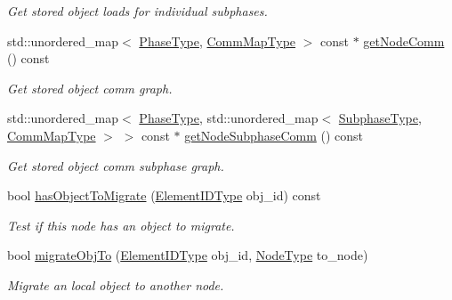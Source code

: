 \begin{DoxyCompactItemize}
\begin{DoxyCompactList}\small\item\em Get stored object loads for individual subphases. \end{DoxyCompactList}\item 
std\+::unordered\+\_\+map$<$ \hyperlink{namespacevt_a46ce6733d5cdbd735d561b7b4029f6d7}{Phase\+Type}, \hyperlink{namespacevt_1_1vrt_1_1collection_1_1balance_a10860c956804d644db54a16012352728}{Comm\+Map\+Type} $>$ const  $\ast$ \hyperlink{structvt_1_1vrt_1_1collection_1_1balance_1_1_node_stats_a236c9f6b9ba7446a35cbc1052949d558}{get\+Node\+Comm} () const
\begin{DoxyCompactList}\small\item\em Get stored object comm graph. \end{DoxyCompactList}\item 
std\+::unordered\+\_\+map$<$ \hyperlink{namespacevt_a46ce6733d5cdbd735d561b7b4029f6d7}{Phase\+Type}, std\+::unordered\+\_\+map$<$ \hyperlink{namespacevt_ae78cbfdf1e57470e33eedb074f2beeba}{Subphase\+Type}, \hyperlink{namespacevt_1_1vrt_1_1collection_1_1balance_a10860c956804d644db54a16012352728}{Comm\+Map\+Type} $>$ $>$ const  $\ast$ \hyperlink{structvt_1_1vrt_1_1collection_1_1balance_1_1_node_stats_ae44b616cad5c50a36faeb2cc78457a52}{get\+Node\+Subphase\+Comm} () const
\begin{DoxyCompactList}\small\item\em Get stored object comm subphase graph. \end{DoxyCompactList}\item 
bool \hyperlink{structvt_1_1vrt_1_1collection_1_1balance_1_1_node_stats_a06128ad9d9dff72bad160b015054b054}{has\+Object\+To\+Migrate} (\hyperlink{namespacevt_1_1vrt_1_1collection_1_1balance_a14c8d2c972f2913aa3f1636e5be0a120}{Element\+I\+D\+Type} obj\+\_\+id) const
\begin{DoxyCompactList}\small\item\em Test if this node has an object to migrate. \end{DoxyCompactList}\item 
bool \hyperlink{structvt_1_1vrt_1_1collection_1_1balance_1_1_node_stats_a4beddbda7ae149a3470eba3a2fe80db5}{migrate\+Obj\+To} (\hyperlink{namespacevt_1_1vrt_1_1collection_1_1balance_a14c8d2c972f2913aa3f1636e5be0a120}{Element\+I\+D\+Type} obj\+\_\+id, \hyperlink{namespacevt_a866da9d0efc19c0a1ce79e9e492f47e2}{Node\+Type} to\+\_\+node)
\begin{DoxyCompactList}\small\item\em Migrate an local object to another node. \end{DoxyCompactList}\item 

\end{DoxyCompactItemize}
